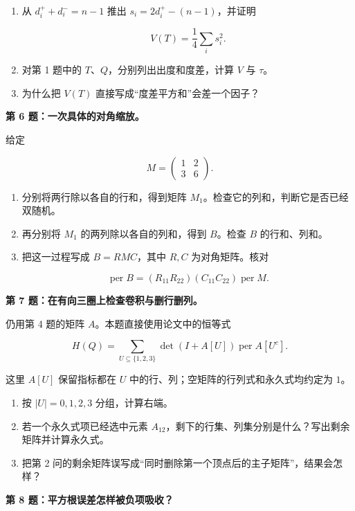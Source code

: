 \documentclass[11pt,a4paper]{article}
\providecommand{\tightlist}{\setlength{\itemsep}{0pt}\setlength{\parskip}{0pt}}
\begin{document}
\begin{enumerate}
\def\labelenumi{\arabic{enumi}.}
\item
  从 \(d_i^++d_i^-=n-1\) 推出 \(s_i=2d_i^+-(n-1)\)，并证明

  \[V(T)=\frac14\sum_i s_i^2.\]
\item
  对第 1 题中的 \(T\)、\(Q\)，分别列出出度和度差，计算 \(V\) 与 \(\tau\)。
\item
  为什么把 \(V(T)\) 直接写成``度差平方和''会差一个因子？
\end{enumerate}

\textbf{第 6 题：一次具体的对角缩放。}

给定

\[M=\begin{pmatrix}1&2\\3&6\end{pmatrix}.\]

\begin{enumerate}
\def\labelenumi{\arabic{enumi}.}
\item
  分别将两行除以各自的行和，得到矩阵 \(M_1\)。检查它的列和，判断它是否已经双随机。
\item
  再分别将 \(M_1\) 的两列除以各自的列和，得到 \(B\)。检查 \(B\) 的行和、列和。
\item
  把这一过程写成 \(B=RMC\)，其中 \(R,C\) 为对角矩阵。核对

  \[\operatorname{per}B
  =(R_{11}R_{22})(C_{11}C_{22})\operatorname{per}M.\]
\end{enumerate}

\textbf{第 7 题：在有向三圈上检查卷积与删行删列。}

仍用第 4 题的矩阵 \(A\)。本题直接使用论文中的恒等式

\[H(Q)=\sum_{U\subseteq\{1,2,3\}}
\det(I+A[U])\operatorname{per}A[U^c].\]

这里 \(A[U]\) 保留指标都在 \(U\) 中的行、列；空矩阵的行列式和永久式均约定为 \(1\)。

\begin{enumerate}
\def\labelenumi{\arabic{enumi}.}
\tightlist
\item
  按 \(|U|=0,1,2,3\) 分组，计算右端。
\item
  若一个永久式项已经选中元素 \(A_{12}\)，剩下的行集、列集分别是什么？写出剩余矩阵并计算永久式。
\item
  把第 2 问的剩余矩阵误写成``同时删除第一个顶点后的主子矩阵''，结果会怎样？
\end{enumerate}

\textbf{第 8 题：平方根误差怎样被负项吸收？}
\end{document}
